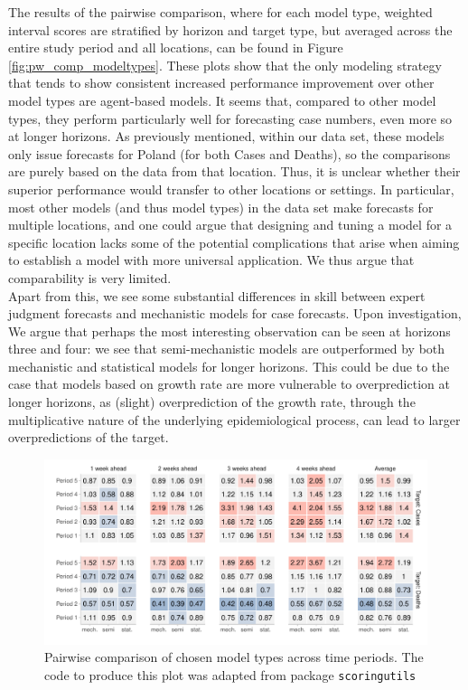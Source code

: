 The results of the pairwise comparison, where for each model type, weighted interval scores are stratified by horizon and target type, but averaged across the entire study period and all locations, can be found in Figure \ref{fig:pw_comp_modeltypes}. These plots show that the only modeling strategy that tends to show consistent increased performance improvement over other model types are agent-based models. It seems that, compared to other model types, they perform particularly well for forecasting case numbers, even more so at longer horizons. As previously mentioned, within our data set, these models only issue forecasts for Poland (for both Cases and Deaths), so the comparisons are purely based on the data from that location. Thus, it is unclear whether their superior performance would transfer to other locations or settings. In particular, most other models (and thus model types) in the data set make forecasts for multiple locations, and one could argue that designing and tuning a model for a specific location lacks some of the potential complications that arise when aiming to establish a model with more universal application. We thus argue that comparability is very limited.\\
Apart from this, we see some substantial differences in skill between expert judgment forecasts and mechanistic models for case forecasts. Upon investigation,  \\
We argue that perhaps the most interesting observation can be seen at horizons three and four: we see that semi-mechanistic models are outperformed by both mechanistic and statistical models for longer horizons. This could be due to the case that models based on growth rate are more vulnerable to overprediction at longer horizons, as (slight) overprediction of the growth rate, through the multiplicative nature of the underlying epidemiological process, can lead to larger overpredictions of the target. \\
\begin{figure}
\centering
\includegraphics[width = \textwidth]{../plots/pw_comp_model_types_across_periods_wide.pdf}
\caption{Pairwise comparison of chosen model types across time periods. The code to produce this plot was adapted from package \texttt{scoringutils}}
\label{fig:pw_comp_modeltypes_byperiod}
\end{figure}
